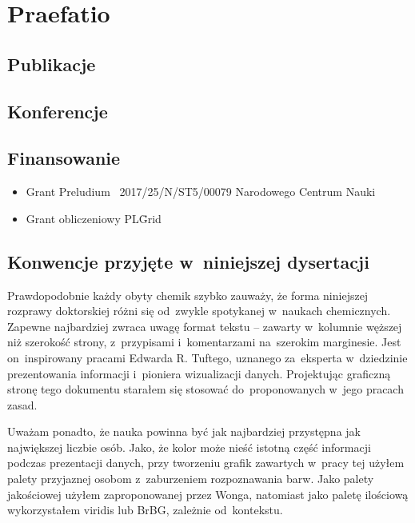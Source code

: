 \chapter{Praefatio}

\section{Publikacje}

\section{Konferencje}

\section{Finansowanie}

\begin{itemize}
  \item Grant Preludium \textnumero~2017/25/N/ST5/00079 Narodowego Centrum Nauki
  \item Grant obliczeniowy PL\=Grid
\end{itemize}


\section{Konwencje przyjęte w~niniejszej dysertacji}

Prawdopodobnie każdy obyty chemik szybko zauważy, że forma niniejszej rozprawy doktorskiej różni się od~zwykle spotykanej w~naukach chemicznych.
Zapewne najbardziej zwraca uwagę format tekstu \--- zawarty w~kolumnie węższej niż szerokość strony, z~przypisami i~komentarzami na~szerokim marginesie.
Jest on~inspirowany pracami\autocite{Tufte2001,Tufte1990,Tufte1997,Tufte2006} Edwarda R. Tuftego,
uznanego za~eksperta w~dziedzinie prezentowania informacji i~pioniera wizualizacji danych\autocite{Yaffa2011}.
Projektując graficzną stronę tego dokumentu starałem się stosować do~proponowanych w~jego pracach zasad.

Uważam ponadto, że nauka powinna być jak najbardziej przystępna jak największej liczbie osób.
Jako, że kolor może nieść istotną część informacji podczas prezentacji danych,
przy tworzeniu grafik zawartych w~pracy tej użyłem palety przyjaznej osobom z~zaburzeniem rozpoznawania barw.
Jako palety jakościowej użyłem zaproponowanej przez Wonga\autocite{wong11},
natomiast jako paletę ilościową wykorzystałem viridis\autocite{Smith2015} lub BrBG, zależnie od~kontekstu.

